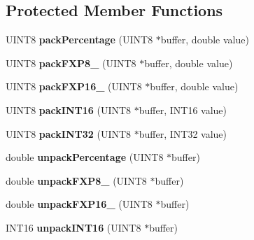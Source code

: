 \subsection*{Protected Member Functions}
\begin{DoxyCompactItemize}
\item 
\hypertarget{classCANJaguar_a2ae92b399f3ed7894c18216ab18de7cb}{
UINT8 {\bfseries packPercentage} (UINT8 $\ast$buffer, double value)}
\label{classCANJaguar_a2ae92b399f3ed7894c18216ab18de7cb}

\item 
\hypertarget{classCANJaguar_acf94b677ffbeb4829698c8b48527b296}{
UINT8 {\bfseries packFXP8\_} (UINT8 $\ast$buffer, double value)}
\label{classCANJaguar_acf94b677ffbeb4829698c8b48527b296}

\item 
\hypertarget{classCANJaguar_a61dcba690fc6e4112025cdf6ad48e92c}{
UINT8 {\bfseries packFXP16\_} (UINT8 $\ast$buffer, double value)}
\label{classCANJaguar_a61dcba690fc6e4112025cdf6ad48e92c}

\item 
\hypertarget{classCANJaguar_ac9fdbc82dd563db0986da50e7ed5645f}{
UINT8 {\bfseries packINT16} (UINT8 $\ast$buffer, INT16 value)}
\label{classCANJaguar_ac9fdbc82dd563db0986da50e7ed5645f}

\item 
\hypertarget{classCANJaguar_af4b4aca16cf31c567c2723b336e4d5c4}{
UINT8 {\bfseries packINT32} (UINT8 $\ast$buffer, INT32 value)}
\label{classCANJaguar_af4b4aca16cf31c567c2723b336e4d5c4}

\item 
\hypertarget{classCANJaguar_a41db61754a1691983a07401162801f7c}{
double {\bfseries unpackPercentage} (UINT8 $\ast$buffer)}
\label{classCANJaguar_a41db61754a1691983a07401162801f7c}

\item 
\hypertarget{classCANJaguar_a0fa1e85c76cf2f00c3536998f1a1fe7b}{
double {\bfseries unpackFXP8\_} (UINT8 $\ast$buffer)}
\label{classCANJaguar_a0fa1e85c76cf2f00c3536998f1a1fe7b}

\item 
\hypertarget{classCANJaguar_afea6d8c7d2b715eab607ffb62ac5e166}{
double {\bfseries unpackFXP16\_} (UINT8 $\ast$buffer)}
\label{classCANJaguar_afea6d8c7d2b715eab607ffb62ac5e166}

\item 
\hypertarget{classCANJaguar_a303bb788587002180deca44df0bb079b}{
INT16 {\bfseries unpackINT16} (UINT8 $\ast$buffer)}
\label{classCANJaguar_a303bb788587002180deca44df0bb079b}


\end{DoxyCompactItemize}
